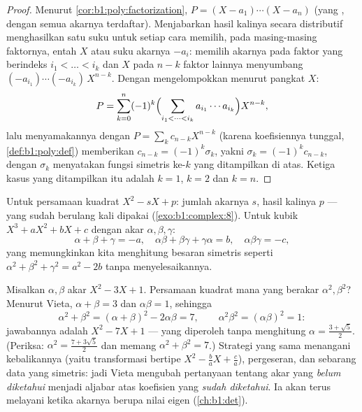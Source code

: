 \begin{proof}
Menurut \cref{cor:b1:poly:factorization}, $P = (X - a_1)\cdots(X -
a_n)$ (yang , dengan semua akarnya terdaftar). Menjabarkan hasil kalinya
secara distributif menghasilkan satu suku untuk setiap cara memilih, pada masing-masing
faktornya, entah $X$ atau suku akarnya $-a_i$: memilih akarnya pada
faktor yang berindeks $i_1 < \dots < i_k$ dan $X$ pada $n - k$
faktor lainnya menyumbang $(-a_{i_1})\cdots(-a_{i_k})\,X^{n-k}$. Dengan mengelompokkan
menurut pangkat $X$:
\[
P = \sum_{k=0}^{n} (-1)^k
\Bigl(\sum_{i_1 < \dots < i_k} a_{i_1}\cdots a_{i_k}\Bigr)
X^{n-k} ,
\]
lalu menyamakannya dengan $P = \sum_k c_{n-k}X^{n-k}$ (karena koefisiennya
tunggal, \cref{def:b1:poly:def}) memberikan $c_{n-k} = (-1)^k
\sigma_k$, yakni $\sigma_k = (-1)^kc_{n-k}$, dengan $\sigma_k$
menyatakan fungsi simetris ke-$k$ yang ditampilkan di atas. Ketiga
kasus yang ditampilkan itu adalah $k = 1$, $k = 2$ dan $k = n$.
\end{proof}

\begin{example}\label{ex:b1:poly:vieta}
Untuk persamaan kuadrat $X^2 - sX + p$: jumlah akarnya $s$, hasil kalinya $p$ ---
yang sudah berulang kali dipakai (\cref{exo:b1:complex:8}). Untuk kubik 
$X^3 + aX^2 + bX + c$ dengan akar $\alpha, \beta, \gamma$:
\[
\alpha + \beta + \gamma = -a,
\quad
\alpha\beta + \beta\gamma + \gamma\alpha = b,
\quad
\alpha\beta\gamma = -c ,
\]
yang memungkinkan kita menghitung besaran simetris seperti $\alpha^2 + \beta^2
+ \gamma^2 = a^2 - 2b$ tanpa menyelesaikannya.
\end{example}

\begin{example}\label{ex:b1:poly:transformroots}
Misalkan $\alpha, \beta$ akar $X^2 - 3X + 1$. Persamaan kuadrat 
mana yang berakar $\alpha^2, \beta^2$? Menurut Vieta, $\alpha +
\beta = 3$ dan $\alpha\beta = 1$, sehingga
\[
\alpha^2 + \beta^2 = (\alpha+\beta)^2 - 2\alpha\beta = 7,
\qquad
\alpha^2\beta^2 = (\alpha\beta)^2 = 1 :
\]
jawabannya adalah $X^2 - 7X + 1$ --- yang diperoleh tanpa menghitung
$\alpha = \frac{3 + \sqrt5}2$. (Periksa: $\alpha^2 = \frac{7 +
3\sqrt5}2$ dan memang $\alpha^2 + \beta^2 = 7$.) Strategi yang
sama menangani kebalikannya (yaitu transformasi bertipe $X^2 - \frac ba X + \frac
ca$), pergeseran, dan sebarang data yang simetris: jadi Vieta
mengubah pertanyaan tentang akar yang \emph{belum diketahui} menjadi aljabar atas
koefisien yang \emph{sudah diketahui}. Ia akan terus melayani ketika
akarnya berupa nilai eigen (\cref{ch:b1:det}).
\end{example}

